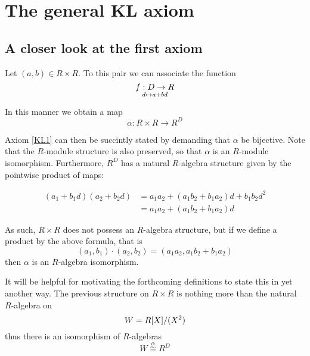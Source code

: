 \chapter{The general KL axiom}

\section{A closer look at the first axiom} \label{ax1re}

Let \( (a,b)\in R\times R \). To this pair we can associate the function
\begin{equation*}
  f:D\to R
  \atop
  d\mapsto a + bd
\end{equation*}

In this manner we obtain a map
\begin{equation*}
  \alpha : R\times R\to R^D
\end{equation*}

Axiom \ref{KL1} can then be succintly stated by demanding that \( \alpha \) be bijective. Note that the \( R \)-module structure is also preserved, so that \( \alpha \) is an \( R \)-module isomorphism. Furthermore, \( R^D \) has a natural \( R \)-algebra structure given by the pointwise product of maps:

\begin{align}
  (a_1 + b_1d)(a_2 + b_2d) & = a_1a_2 + (a_1b_2 + b_1a_2)d + b_1b_2d^2 \\
                           & = a_1a_2 + (a_1b_2 + b_1a_2)d
  \label{R-alg}
\end{align}

As such, \( R\times R \) does not possess an \( R \)-algebra structure, but if we define a product by the above formula, that is
\begin{equation*}
  (a_1,b_1)\cdot(a_2,b_2) = (a_1a_2,a_1b_2 + b_1a_2)
\end{equation*}
then \( \alpha  \) is an \( R \)-algebra isomorphism.

It will be helpful for motivating the forthcoming definitions to state this in yet another way. The previous structure on \( R\times R \) is nothing more than the natural \( R \)-algebra on
\begin{equation*}
  W = R[X]/(X^2)
\end{equation*}
thus there is an isomorphism of \( R \)-algebras
\begin{equation*}
  W \stackrel{\alpha}{\cong} R^D
\end{equation*}

